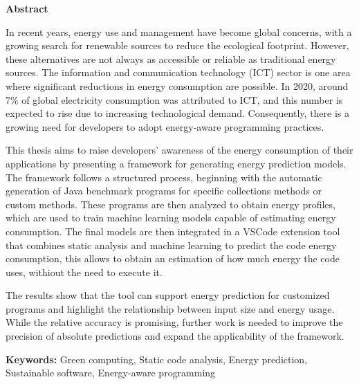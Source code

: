 \vspace*{2cm}
\begin{center}
\Large \bf Abstract
\end{center}
\vspace*{1cm} \setlength{\baselineskip}{0.6cm}

In recent years, energy use and management have become global concerns, with a growing search for renewable sources to reduce the ecological footprint. However, these alternatives are not always as accessible or reliable as traditional energy sources. The information and communication technology (ICT) sector is one area where significant reductions in energy consumption are possible. In 2020, around 7\% of global electricity consumption was attributed to ICT, and this number is expected to rise due to increasing technological demand. Consequently, there is a growing need for developers to adopt energy-aware programming practices.

This thesis aims to raise developers’ awareness of the energy consumption of their applications by presenting a framework for generating energy prediction models. The framework follows a structured process, beginning with the automatic generation of Java benchmark programs for specific collections methods or custom methods. These programs are then analyzed to obtain energy profiles, which are used to train machine learning models capable of estimating energy consumption. The final models are then integrated in a VSCode extension tool that combines static analysis and machine learning to predict the code energy consumption, this allows to obtain an estimation of how much energy the code uses, withiout the need to execute it.

The results show that the tool can support energy prediction for customized programs and highlight the relationship between input size and energy usage. While the relative accuracy is promising, further work is needed to improve the precision of absolute predictions and expand the applicability of the framework.



\vfill

\begin{flushleft}
\textbf{Keywords:}
Green computing, Static code analysis, Energy prediction, Sustainable software, Energy-aware programming
\end{flushleft}

{}

